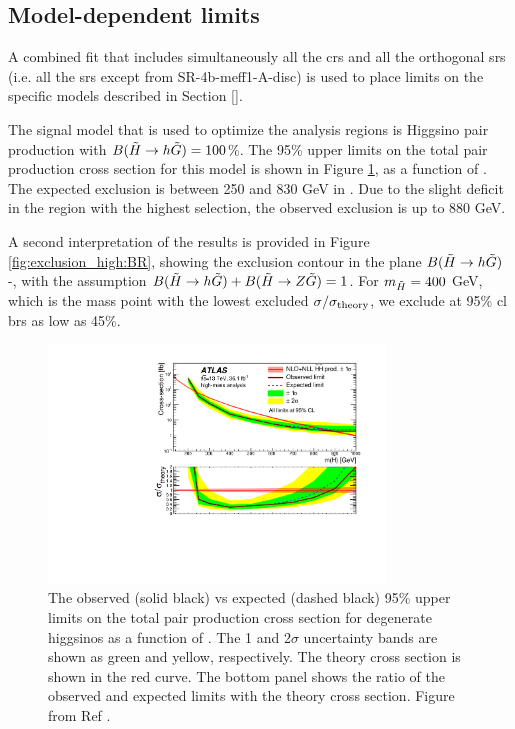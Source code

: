 \subsection{Model-dependent limits}
\label{sec:ewk:modeldep}

A combined fit that includes simultaneously all the \glspl{cr} and all the orthogonal \glspl{sr} (i.e. all the \glspl{sr}
except from  SR-4b-meff1-A-disc) is used to place limits on the specific models described in Section \ref{}.

The signal model that is used to optimize the analysis regions is Higgsino pair production with $B(\tilde{H}\rightarrow h \tilde{G})=100$\%.
The 95\% upper limits on the total pair production cross section for this model is shown in Figure \ref{fig:exclusion_high}, 
as a function of \mhino. 
The expected exclusion is between 250 and 830 GeV in \mhino. 
Due to the slight deficit in the region with the highest \meffb selection, the observed exclusion is up to 880 GeV.

A second interpretation of the results is provided in Figure \ref{fig:exclusion_high:BR}, showing the exclusion contour in the 
plane $B(\tilde{H}\rightarrow h \tilde{G})$-\mhino, with the assumption $B(\tilde{H}\rightarrow h \tilde{G}) + B(\tilde{H}\rightarrow Z \tilde{G}) =1$.
For $m_{\tilde{H}} = 400$ GeV, which is the mass point with the lowest excluded $\sigma/\sigma_{\rm theory}$, we exclude at 95\% \gls{cl}
\glspl{br} as low as 45\%.


\begin{figure}[htbp]
	\centering
	\includegraphics[width=0.8\textwidth]{figures/ewk_prod/interpretation/limit_HM}
	\caption{The observed (solid black) vs expected (dashed black) 95\% upper limits on the total pair production cross section for degenerate higgsinos as a function of \mhino. The 1 and 2$\sigma$ uncertainty bands are shown as green and yellow, respectively. The theory cross section is shown in the red curve. The bottom panel shows the ratio of the observed and expected limits with the theory cross section. Figure from Ref \cite{Aaboud:2018htj}.} 
	\label{fig:exclusion_high}
\end{figure}

